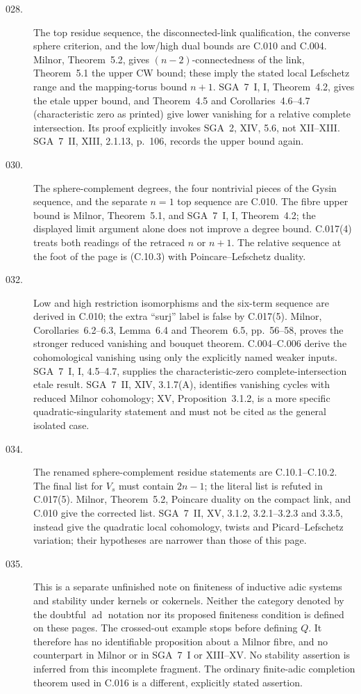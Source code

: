 \begin{description}
\item[028.] The top residue sequence, the disconnected-link
qualification, the converse sphere criterion, and the low/high
dual bounds are C.010 and C.004. Milnor, Theorem~5.2, gives
$(n-2)$-connectedness of the link, Theorem~5.1 the upper CW
bound; these imply the stated local Lefschetz range and the
mapping-torus bound $n+1$. SGA~7~I, I, Theorem~4.2, gives the
etale upper bound, and Theorem~4.5 and Corollaries~4.6--4.7
(characteristic zero as printed) give lower vanishing for a
relative complete intersection. Its proof explicitly invokes
SGA~2, XIV, 5.6, not XII--XIII. SGA~7~II, XIII, 2.1.13, p.~106, records
the upper bound again.

\item[030.] The sphere-complement degrees, the four nontrivial
pieces of the Gysin sequence, and the separate $n=1$ top sequence
are C.010. The fibre upper bound is Milnor, Theorem~5.1, and
SGA~7~I, I, Theorem~4.2; the displayed limit argument alone does
not improve a degree bound. C.017(4) treats both readings of the
retraced $n$ or $n+1$. The relative sequence at the foot of the
page is (C.10.3) with Poincare--Lefschetz duality.

\item[032.] Low and high restriction isomorphisms and the six-term
sequence are derived in C.010; the extra ``surj'' label is false
by C.017(5). Milnor, Corollaries~6.2--6.3, Lemma~6.4 and Theorem~6.5,
pp.~56--58, proves the
stronger reduced vanishing and bouquet theorem. C.004--C.006
derive the cohomological vanishing using only the explicitly named
weaker inputs. SGA~7~I, I, 4.5--4.7, supplies the characteristic-zero
complete-intersection etale result. SGA~7~II, XIV, 3.1.7(A),
identifies vanishing cycles with reduced Milnor cohomology;
XV, Proposition~3.1.2, is a more specific quadratic-singularity
statement and must not be cited as the general isolated case.

\item[034.] The renamed sphere-complement residue statements are
C.10.1--C.10.2. The final list for $V_s$ must contain $2n-1$;
the literal list is refuted in C.017(5). Milnor, Theorem~5.2,
Poincare duality on the compact link, and C.010 give the corrected
list. SGA~7~II, XV, 3.1.2, 3.2.1--3.2.3 and 3.3.5, instead give
the quadratic local cohomology, twists and Picard--Lefschetz
variation; their hypotheses are narrower than those of this page.

\item[035.] This is a separate unfinished note on finiteness of
inductive adic systems and stability under kernels or cokernels.
Neither the category denoted by the doubtful $\operatorname{ad}$
notation nor its proposed finiteness condition is defined on
these pages. The crossed-out example stops before defining $Q$.
It therefore has no identifiable proposition about a Milnor fibre,
and no counterpart in Milnor or in SGA~7~I or XIII--XV. No
stability assertion is inferred from this incomplete fragment.
The ordinary finite-adic completion theorem used in C.016 is a
different, explicitly stated assertion.
\end{description}
